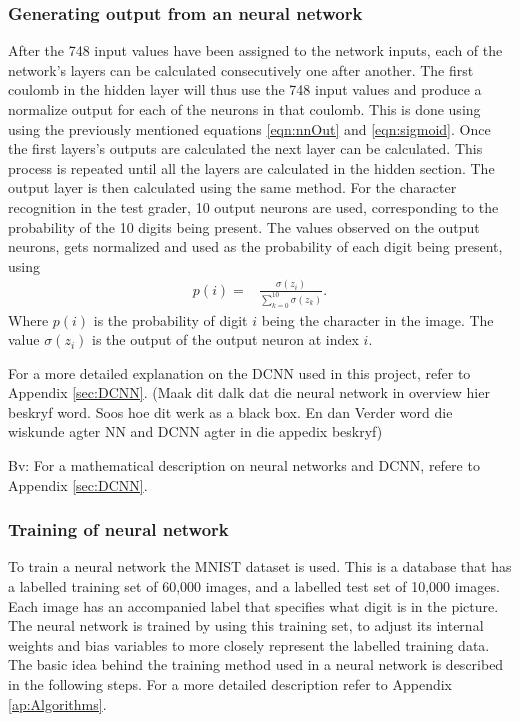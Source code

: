\subsubsection{Generating output from an neural network}
After the 748 input values have been assigned to the network inputs, each of the network's layers can be calculated consecutively one after another. The first coulomb in the hidden layer will thus use the 748 input values and produce a normalize output for each of the neurons in that coulomb. This is done using using the previously mentioned equations \ref{eqn:nnOut} and \ref{eqn:sigmoid}. Once the first layers's outputs are calculated the next layer can be calculated. This process is repeated until all the layers are calculated in the hidden section. The output layer is then calculated using the same method. For the character recognition in the test grader, 10 output neurons are used, corresponding to the probability of the 10 digits being present. The values observed on the output neurons, gets normalized and used as the probability of each digit being present, using
\begin{align}
  p(i) =  &\displaystyle{\frac{\sigma(z_{i})}{\sum_{k=0}^{10} \sigma(z_{k})}}.
\label{eqn:normal}
\end{align}
Where $p(i)$ is the probability of digit $i$ being the character in the image. The value $\sigma(z_{i})$ is the output of the output neuron at index $i$.

For a more detailed explanation on the DCNN used in this project, refer to Appendix \ref{sec:DCNN}. (Maak dit dalk dat die neural network in overview hier beskryf word. Soos hoe dit werk as a black box. En dan Verder word die wiskunde agter NN and DCNN agter in die appedix beskryf)

Bv: For a mathematical description on neural networks and DCNN, refere to Appendix \ref{sec:DCNN}.

\subsubsection{Training of neural network}
\label{sec:trainNN}
To train a neural network the MNIST dataset is used. This is a database that has a labelled training set of 60,000 images, and a labelled test set of 10,000 images. Each image has an accompanied label that specifies what digit is in the picture. The neural network is trained by using this training set, to adjust its internal weights and bias variables to more closely represent the labelled training data. The basic idea behind the training method used in a neural network is described in the following steps. For a more detailed description refer to Appendix \ref{ap:Algorithms}.

